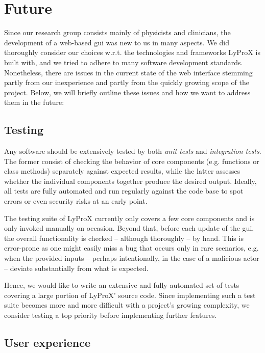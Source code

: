 \documentclass[\relativeRoot/main.tex]{subfiles}
\begin{document}
\section{Future}
\label{sec:lyprox:future}

Since our research group consists mainly of physicists and clinicians, the development of a web-based \gls{gui} was new to us in many aspects. We did thoroughly consider our choices w.r.t. the technologies and frameworks LyProX is built with, and we tried to adhere to many software development standards. Nonetheless, there are issues in the current state of the web interface stemming partly from our inexperience and partly from the quickly growing scope of the project. Below, we will briefly outline these issues and how we want to address them in the future:

\subsection*{Testing}

Any software should be extensively tested by both \emph{unit tests} and \emph{integration tests}. The former consist of checking the behavior of core components (e.g. functions or class methods) separately against expected results, while the latter assesses whether the individual components together produce the desired output. Ideally, all tests are fully automated and run regularly against the code base to spot errors or even security risks at an early point.

The testing suite of LyProX currently only covers a few core components and is only invoked manually on occasion. Beyond that, before each update of the \gls{gui}, the overall functionality is checked -- although thoroughly -- by hand. This is error-prone as one might easily miss a bug that occurs only in rare scenarios, e.g. when the provided inputs -- perhaps intentionally, in the case of a malicious actor -- deviate substantially from what is expected.

Hence, we would like to write an extensive and fully automated set of tests covering a large portion of LyProX' source code. Since implementing such a test suite becomes more and more difficult with a project's growing complexity, we consider testing a top priority before implementing further features.

\subsection*{User experience}
\end{document}
